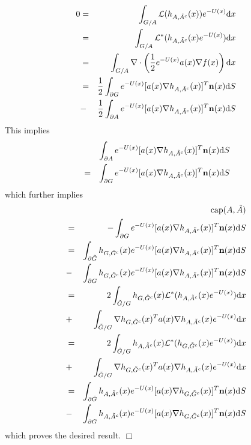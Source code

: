 \documentclass[english, aip, jcp, priprint, graphicx,floatfix]{revtex4-1}
\newcommand{\mathd}{\mathrm{d}}
\newcommand{\tmop}[1]{\ensuremath{\operatorname{#1}}}
\theoremstyle{plain}
\theoremstyle{definition}
\theoremstyle{plain}
\begin{document}
\begin{eqnarray*}
0 & = & \int_{G / A} \mathcal{L} (h_{A, \tilde{A}^c} (x)) e^{- U (x)} \mathd
x\\
& = & \int_{G / A} \mathcal{L}^{\ast} (h_{A, \tilde{A}^c} (x) e^{- U (x)})
\mathd x\\
& = & \int_{G / A} \nabla \cdot \left( \frac{1}{2} e^{- U (x)} a (x) \nabla
f (x) \right) \mathd x\\
& = & \frac{1}{2} \int_{\partial G} e^{- U (x)} [a (x) \nabla h_{A,
\tilde{A}^c} (x)]^T {\textbf n} (x) \mathd S\\
& - & \frac{1}{2} \int_{\partial A} e^{- U (x)} [a (x) \nabla h_{A,
\tilde{A}^c} (x)]^T {\textbf n} (x) \mathd S\\
\end{eqnarray*}
This implies
\begin{eqnarray*}
&  & \int_{\partial A} e^{- U (x)} [a (x) \nabla h_{A,
\tilde{A}^c} (x)]^T {\textbf n} (x) \mathd S\\
& = & \int_{\partial G} e^{- U (x)} [a (x) \nabla h_{A, \tilde{A}^c} (x)]^T
{\textbf n} (x) \mathd S\\
\end{eqnarray*}
which further implies
\begin{eqnarray*}
&  & \tmop{cap} (A, \tilde{A})\\
& = & - \int_{\partial G} e^{- U (x)} [a (x) \nabla h_{A, \tilde{A}^c}
(x)]^T {\textbf n} (x) \mathd S\\
& = & \int_{\partial \tilde{G}} h_{G, \tilde{G}^c} (x) e^{- U (x)} [a (x)
\nabla h_{A, \tilde{A}^c} (x)]^T {\textbf n} (x) \mathd S\\
& - & \int_{\partial G} h_{G, \tilde{G}^c} (x) e^{- U (x)} [a (x) \nabla
h_{A, \tilde{A}^c} (x)]^T {\textbf n} (x) \mathd S\\
& = & 2 \int_{\tilde{G} / G} h_{G, \tilde{G}^c} (x) \mathcal{L}^{\ast}
(h_{A, \tilde{A}^c} (x) e^{- U (x)}) \mathd x\\
& + & \int_{\tilde{G} / G} \nabla h_{G, \tilde{G}^c} (x)^T a (x) \nabla
h_{A, \tilde{A}^c} (x) e^{- U (x)} \mathd x\\
& = & 2 \int_{\tilde{G} / G} h_{A, \tilde{A}^c} (x) \mathcal{L}^{\ast}
(h_{G, \tilde{G}^c} (x) e^{- U (x)}) \mathd x\\
& + & \int_{\tilde{G} / G} \nabla h_{G, \tilde{G}^c} (x)^T a (x) \nabla
h_{A, \tilde{A}^c} (x) e^{- U (x)} \mathd x\\
& = & \int_{\partial \tilde{G}} h_{A, \tilde{A}^c} (x) e^{- U (x)} [a (x)
\nabla h_{G, \tilde{G}^c} (x)]^T {\textbf n} (x) \mathd S\\
& - & \int_{\partial G} h_{A, \tilde{A}^c} (x) e^{- U (x)} [a (x) \nabla
h_{G, \tilde{G}^c} (x)]^T {\textbf n} (x) \mathd S
\end{eqnarray*}
which proves the desired result.
\hspace*{\fill}$\Box$\medskip
\end{document}
